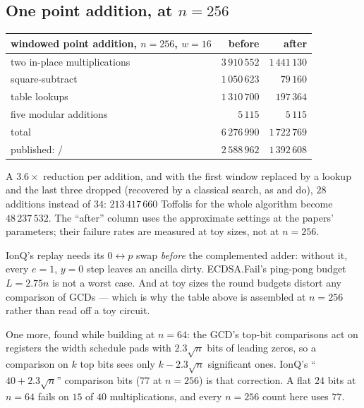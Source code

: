 \documentclass[11pt]{article}
\theoremstyle{plain}
\theoremstyle{remark}
\begin{document}
\subsection{One point addition, at $n=256$}

\begin{center}\small
\begin{tabular}{lrr}
\toprule
windowed point addition, $n=256$, $w=16$ & before & after\\
\midrule
two in-place multiplications & $3\,910\,552$ & $1\,441\,130$\\
square-subtract & $1\,050\,623$ & $79\,160$\\
table lookups & $1\,310\,700$ & $197\,364$\\
five modular additions & $5\,115$ & $5\,115$\\
\midrule
total & $6\,276\,990$ & $1\,722\,769$\\
published: \cite{ec:schrott26} / \cite{ec:ionq26} & $2\,588\,962$ & $1\,392\,608$\\
\bottomrule
\end{tabular}
\end{center}

A $3.6\times$ reduction per addition, and with the first window replaced by a lookup and
the last three dropped (recovered by a classical search, as \cite{ec:babbush26} and
\cite{ec:ionq26} do), $28$ additions instead of $34$: $213\,417\,660$ Toffolis for the whole
algorithm become $48\,237\,532$. The ``after'' column uses the approximate settings at the papers'
parameters; their failure rates are measured at toy sizes, not at $n=256$.

\begin{warnbox}[title={What reproducing the sources turned up}]
IonQ's replay needs its $0\leftrightarrow p$ swap \emph{before} the complemented adder: without it,
every $e=1$, $y=0$ step leaves an ancilla dirty. ECDSA.Fail's ping-pong budget $L=2.75n$ is not a
worst case. And at toy sizes the round budgets distort any comparison of GCDs --- which is why the
table above is assembled at $n=256$ rather than read off a toy circuit.

One more, found while building at $n=64$: the GCD's top-bit comparisons act on registers the width
schedule pads with $2.3\sqrt n$ bits of leading zeros, so a comparison on $k$ top bits sees only
$k-2.3\sqrt n$ significant ones. IonQ's ``$40+2.3\sqrt n$'' comparison bits ($77$ at $n=256$) is
that correction. A flat $24$ bits at $n=64$ fails on $15$ of $40$ multiplications, and every
$n=256$ count here uses $77$.
\end{warnbox}
\end{document}
